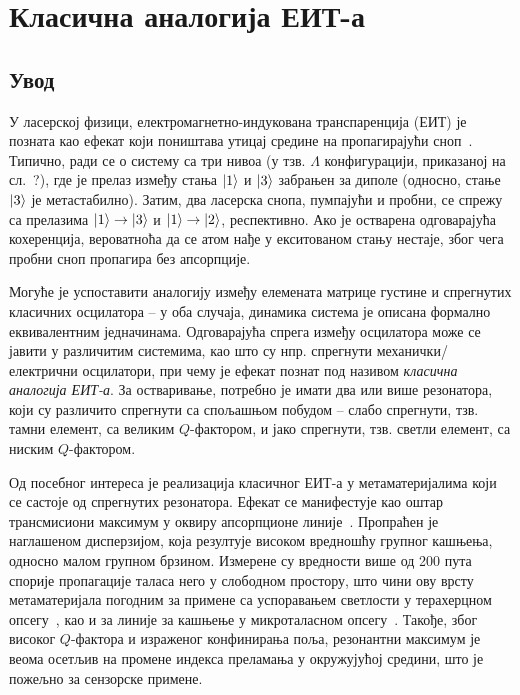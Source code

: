 \documentclass[main.tex]{subfiles}
\begin{document}
\chapter{Класична аналогија ЕИТ-а}%
\label{cha:klasik_eit}

\section{Увод}%
\label{sec:uvod}

У ласерској физици, електромагнетно-индукована транспаренција (ЕИТ) је позната као ефекат који поништава утицај средине на пропагирајући сноп~\cite{harris1990nonlinear}. Типично, ради се о систему са три нивоа (у тзв. $\Lambda$ конфигурацији, приказаној на сл.~?), где је прелаз између стања $\ket{1}$ и $\ket{3}$ забрањен за диполе (односно, стање $\ket{3}$ је метастабилно). Затим, два ласерска снопа, пумпајући и пробни, се спрежу са прелазима $\ket{1}\to\ket{3}$ и $\ket{1}\to\ket{2}$, респективно. Ако је остварена одговарајућа кохеренција, вероватноћа да се атом нађе у екситованом стању нестаје, због чега пробни сноп пропагира без апсорпције.

Могуће је успоставити аналогију између елемената матрице густине и спрегнутих класичних осцилатора – у оба случаја, динамика система је описана формално еквивалентним једначинама. Одговарајућа спрега између осцилатора може се јавити у различитим системима, као што су нпр. спрегнути механички/електрични осцилатори, при чему је ефекат познат под називом \emph{класична аналогија ЕИТ-а}. За остваривање, потребно је имати два или више резонатора, који су различито спрегнути са спољашњом побудом – слабо спрегнути, тзв. тамни елемент, са великим $Q$-фактором, и јако спрегнути, тзв. светли елемент, са ниским $Q$-фактором.

Од посебног интереса је реализација класичног ЕИТ-а у метаматеријалима који се састоје од спрегнутих резонатора. Ефекат се манифестује као оштар трансмисиони максимум у оквиру апсорпционе линије~\cite{tassin:09,cihan,mr05}. Пропраћен је наглашеном дисперзијом, која резултује високом вредношћу групног кашњења, односно малом групном брзином. Измерене су вредности више од 200 пута спорије пропагације таласа него у слободном простору, што чини ову врсту метаматеријала погодним за примене са успоравањем светлости у терахерцном опсегу~\cite{tassin:09}, као и за линије за кашњење у микроталасном опсегу~\cite{mr05}. Такође, због високог $Q$-фактора и израженог конфинирања поља, резонантни максимум је веома осетљив на промене индекса преламања у окружујућој средини, што је пожељно за сензорске примене.
\end{document}
